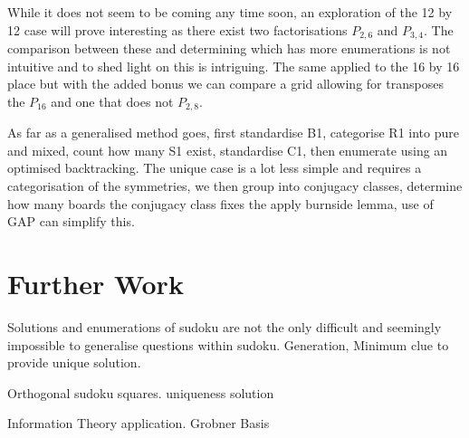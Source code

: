\documentclass[a4paper,11pt]{report}
\begin{document}
While it does not seem to be coming any time soon, an exploration of the 12 by 12 case will prove interesting as there exist two factorisations $P_{2,6}$ and $P_{3,4}$. The comparison between these and determining which has more enumerations is not intuitive and to shed light on this is intriguing. The same applied to the 16 by 16 place but with the added bonus we can compare a grid allowing for transposes the $P_{16}$ and one that does not $P_{2,8}$.

As far as a generalised method goes, first standardise B1, categorise R1 into pure and mixed, count how many S1 exist, standardise C1, then enumerate using an optimised backtracking. The unique case is a lot less simple and requires a categorisation of the symmetries, we then group into conjugacy classes, determine how many boards the conjugacy class fixes the apply burnside lemma, use of GAP can simplify this.

\chapter{Further Work}

Solutions and enumerations of sudoku are not the only difficult and seemingly impossible to generalise questions within sudoku. Generation, Minimum clue to provide unique solution.

Orthogonal sudoku squares. uniqueness solution 

Information Theory application.
Grobner Basis


\end{document}
